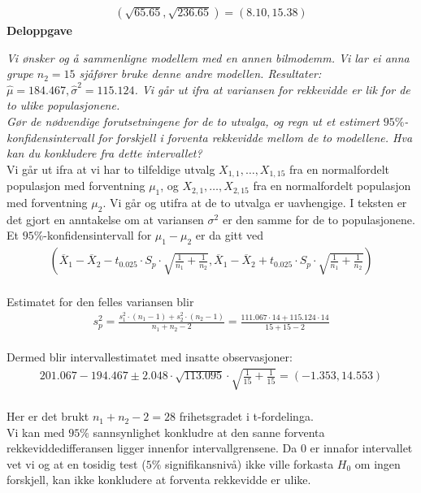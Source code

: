 \documentclass[final,hyperref={pdfpagelabels=false}]{beamer}
\newcommand{\deloppgave}[2]
{\footnotesize\center\textbf{Deloppgave}\\ \raggedright \textit{#1}\\#2\\}
\newcommand{\matte}[1]{\vspace{-3mm}\begin{align*}#1\end{align*}}
\newcommand{\maths}[1]{\vspace{-3mm}\begin{align*}#1\end{align*}\\\vspace{-3mm}}
\newcommand{\ol}[0]{\overline}
\begin{document}
\begin{frame}{}
\begin{columns}[t]
\begin{column}{.33\linewidth}
\begin{block}{}
{					\matte{(\sqrt{65.65},\sqrt{236.65})=(8.10,15.38)}
				}
				\deloppgave{Vi ønsker og å sammenligne modellem med en annen bilmodemm.
					Vi lar ei anna grupe $n_2=15$ sjåfører bruke denne andre modellen. Resultater: $\hat \mu=184.467, \hat \sigma^2=115.124$. Vi går ut ifra at variansen for rekkevidde er lik for de to ulike populasjonene.\\
					Gør de nødvendige forutsetningene for de to utvalga, og regn ut et estimert $95\%$-konfidensintervall for forskjell i forventa rekkevidde mellom de to modellene.
					Hva kan du konkludere fra dette intervallet?}
				{Vi går ut ifra at vi har to tilfeldige utvalg $X_{1,1},\ldots,X_{1,15}$ fra en normalfordelt populasjon med forventning $\mu_1$, og $X_{2,1},\ldots,X_{2,15}$ fra en normalfordelt populasjon med forventning $\mu_2$.
					Vi går og utifra at de to utvalga er uavhengige.
					I teksten er det gjort en anntakelse om at variansen $\sigma^2$ er den samme for de to populasjonene.\\
					Et $95\%$-konfidensintervall for $\mu_1-\mu_2$ er da gitt ved
					\maths{\left(\ol X_1 -\ol X_2-t_{0.025}\cdot S_p\cdot\sqrt{\frac{1}{n_1}+\frac{1}{n_2}},\ol X_1 -\ol X_2+t_{0.025}\cdot S_p\cdot\sqrt{\frac{1}{n_1}+\frac{1}{n_2}} \right)}
					Estimatet for den felles variansen blir
					\maths{s_p^2=\frac{s_1^2\cdot(n_1-1)+s_2^2\cdot(n_2-1)}{n_1+n_2-2}=\frac{111.067\cdot 14 + 115.124 \cdot 14}{15+15-2}}
					Dermed blir intervallestimatet med insatte observasjoner:
					\maths{201.067-194.467\pm2.048\cdot\sqrt{113.095}\cdot\sqrt{\frac{1}{15}+\frac{1}{15}}=(-1.353,14.553)}
					Her er det brukt $n_1+n_2-2=28$ frihetsgradet i t-fordelinga.\\
					Vi kan med $95\%$ sannsynlighet konkludre at den sanne forventa rekkeviddedifferansen ligger innenfor intervallgrensene.
					Da $0$ er innafor intervallet vet vi og at en tosidig test ($5\%$ signifikansnivå) ikke ville forkasta $H_0$ om ingen forskjell, kan ikke konkludere at forventa rekkevidde er ulike.
				}
			\end{block}
		\end{column}
	\end{columns}
\end{frame}
\end{document}
